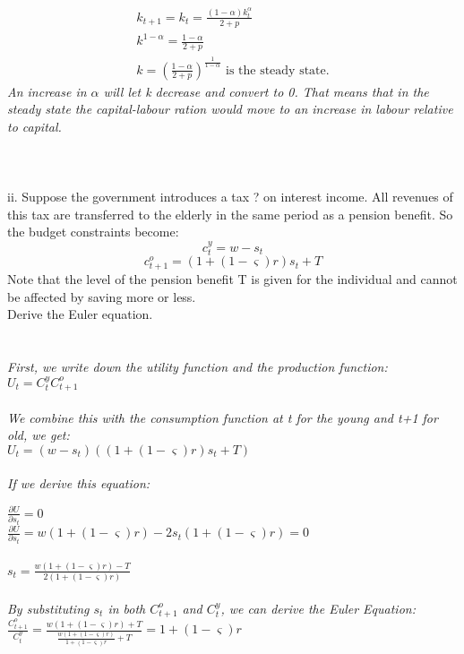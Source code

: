 \documentclass{article}
\begin{document}
\begin{eqnarray}
k_{t+1} = k_t = \frac {(1-\alpha)k_t^\alpha}{2+p} \nonumber \\
k^{1-\alpha} = \frac{1-\alpha}{2+p} \nonumber \\
k= (\frac{1-\alpha}{2+p})^\frac{1}{1-\alpha} \mbox{ is the steady state.}\nonumber 
\end{eqnarray}
\textit{An increase in $\alpha$ will let k decrease and convert to 0. That means that in the steady state the capital-labour ration would move to an increase in labour relative to capital.}
 \\
 \\
 \\
 \\
ii. Suppose the government introduces a tax ? on interest income. All revenues of this tax are transferred to the elderly in the same period as a pension benefit. So the budget constraints become:
\begin{equation}
c_t^y=w-s_t
\end{equation}
\begin{equation}
c_{t+1}^o = (1+(1-\varsigma)r)s_t+T
\end{equation}
Note that the level of the pension benefit T is given for the individual and cannot be affected by saving more or less.\\
Derive the Euler equation. \\
\\
\\
\textit{First, we write down the utility function and the production function:}\\
$U_t = C_t^yC_{t+1}^o$\\
\\ 
\textit{We combine this with the consumption function at t for the young and t+1 for old, we get:}\\
$U_t = (w-s_t)((1+(1-\varsigma)r)s_t+T)$\\
\\
\textit{If we derive this equation:}

$\frac{\partial U}{\partial s_t} = 0 $\\
$\frac{\partial U}{\partial s_t} = w(1+(1-\varsigma)r) - 2s_t(1+(1-\varsigma)r) = 0$\\
\\
$s_t = \frac{w(1+(1-\varsigma)r)-T}{2(1+(1-\varsigma)r)} $\\
\\
\textit{By substituting $s_t$ in both $C_{t+1}^o$ and $C_t^y$, we can derive the Euler Equation:}\\
$\frac{C_{t+1}^o}{C_t^y} = \frac{w(1+(1-\varsigma)r)+T}{\frac{w(1+(1-\varsigma)r)}{1+(1-\varsigma)r}+T} =1+(1-\varsigma)r$
\end{document}
